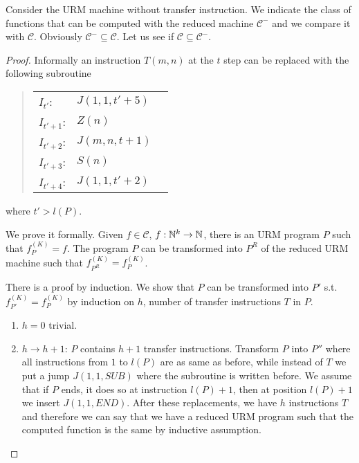 \begin{exercise}
Consider the URM machine without transfer instruction. We indicate the class
of functions that can be computed with the reduced machine $\mathcal{C}^- $ and
we compare it with $\mathcal{C} $. Obviously $\mathcal{C}^- \subseteq \mathcal{C}
$. Let us see if $\mathcal{C} \subseteq \mathcal{C}^-$. 
\begin{proof}
Informally an instruction $T(m,n)$ at the $t$ step
can be replaced with the following subroutine
\begin{quote}
  \begin{tabular}{lll}
    $I_{t'}$:   & $J(1,1,t'+5)$  \\
    $I_{t'+1}$: & $Z(n)$        \\
    $I_{t'+2}$: & $J(m,n,t+1)$  \\
    $I_{t'+3}$: & $S(n)$        \\
    $I_{t'+4}$: & $J(1,1,t'+2)$ \\
  \end{tabular}
\end{quote}
where $t'>l(P)$.

We prove it formally. 
Given $f \in \mathcal{C} $, $f: \mathbb{N}^k \rightarrow \mathbb{N} $, there is an URM program $P$ such that $f_P^{(K)}  = f$. The program $P$ can be transformed into $P ^R $ of the reduced URM machine such that $f_{P^R}^{(K)}  = f_{P}^{(K)}$.

There is a proof by induction. We show that $P$ can be transformed into $P' $ s.t. $ f_{P'}^{(K)}  = f_{P}^{(K)} $ by induction on $h$, number of transfer instructions $T$ in $P$.

\begin{enumerate}
  \item $h = 0$ trivial.
  \item $h \rightarrow  h + 1$: $P$ contains $h + 1$ transfer instructions.
  Transform $P$ into $P''$ where all instructions from $1$ to $l(P)$ are as same as before, while instead of $T$ we put a jump $J(1,1, SUB)$ where the subroutine is written before. 
  We assume that if $P$ ends, it does so at instruction $l(P) + 1$, then at position $l(P) + 1$ we insert $J (1,1, END)$. 
  After these replacements, we have $h$ instructions $T$ and therefore we can say that we have a reduced URM program such that the computed function is the same by inductive assumption.
\end{enumerate}
\end{proof}
\end{exercise}

